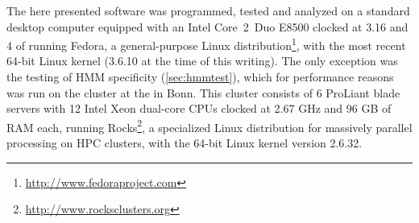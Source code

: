 The here presented software was programmed, tested and analyzed on a standard
desktop computer equipped with an Intel \mbox{Core 2 Duo} E8500
 clocked at 3.16
 and 4  of
 running Fedora, a general-purpose Linux
distribution\footnote{\url{http://www.fedoraproject.com}}, with the most recent
64-bit Linux kernel (3.6.10 at the time of this writing). The only exception was
the testing of HMM specificity (\autoref{sec:hmmtest}), which for performance
reasons was run on the  cluster at
the  in Bonn. This
cluster consists of 6  ProLiant blade servers
with 12 Intel Xeon dual-core CPUs clocked at 2.67 GHz and 96 GB of RAM each,
running Rocks\footnote{\url{http://www.rocksclusters.org}}, a specialized Linux
distribution for massively parallel processing on HPC clusters, with the 64-bit
Linux kernel version 2.6.32.
